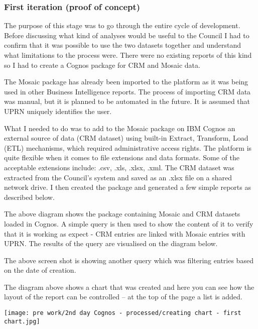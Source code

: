 			\subsubsection{First iteration (proof of concept)}
			
The purpose of this stage was to go through the entire cycle of development. Before discussing what kind of analyses would be useful to the Council I had to confirm that it was possible to use the two datasets together and understand what limitations to the process were. There were no existing reports of this kind so I had to create a Cognos package for CRM and Mosaic data.

The Mosaic package has already been imported to the platform as it was being used in other Business Intelligence reports. The process of importing CRM data was manual, but it is planned to be automated in the future. It is assumed that UPRN uniquely identifies the user.

What I needed to do was to add to the Mosaic package on IBM Cognos an external source of data (CRM dataset) using built-in Extract, Transform, Load (ETL) mechanisms, which required administrative access rights. The platform is quite flexible when it comes to file extensions and data formats. Some of the acceptable extensions include: .csv, .xls, .xlsx, .xml. The CRM dataset was extracted from the Council's system and saved as an .xlsx file on a shared network drive. I then created the package and generated a few simple reports as described below.

The above diagram shows the package containing Mosaic and CRM datasets loaded in Cognos. A simple query is then used to show the content of it to verify that it is working as expect - CRM entries are linked with Mosaic entries with UPRN. The results of the query are visualised on the diagram below.

The above screen shot is showing another query which was filtering entries based on the date of creation.

The diagram above shows a chart that was created and here you can see how the layout of the report can be controlled – at the top of the page a list is added.



\begin{center}
  \texttt{[image: pre work/2nd day Cognos - processed/creating chart - first chart.jpg]}
  \label{normal_case}
\end{center}

